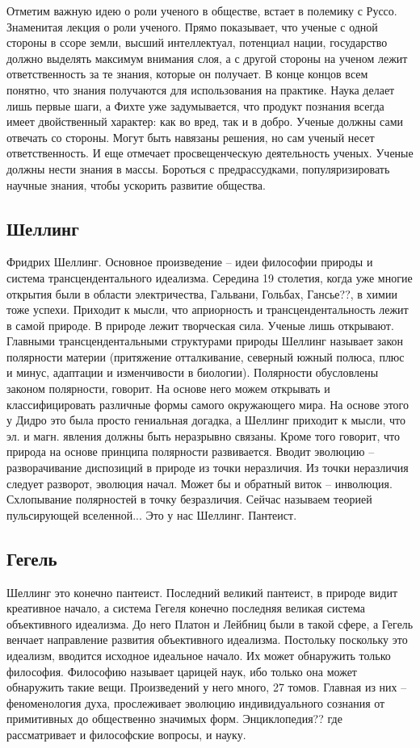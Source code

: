 \documentclass[a4paper, 12pt]{article}
\begin{document}
Отметим важную идею о роли ученого в обществе, встает в полемику 
с Руссо. Знаменитая лекция о роли ученого. Прямо показывает, что ученые 
с одной стороны в ссоре земли, высший интеллектуал, потенциал нации, 
государство должно выделять максимум внимания слоя, а с другой стороны 
на ученом лежит ответственность за те знания, которые он получает. 
В конце концов всем понятно, что знания получаются для использования на 
практике. Наука делает лишь первые шаги, а Фихте уже задумывается, что 
продукт познания всегда имеет двойственный характер: как во вред, так 
и в добро. Ученые должны сами отвечать со стороны. Могут быть навязаны 
решения, но сам ученый несет ответственность. И еще отмечает 
просвещенческую деятельность ученых. Ученые должны нести знания в массы. 
Бороться с предрассудками, популяризировать научные знания, чтобы 
ускорить развитие общества.

\subsection{Шеллинг}
Фридрих Шеллинг. Основное произведение -- идеи философии природы 
и система трансцендентального идеализма. Середина 19 столетия, когда уже 
многие открытия были в области электричества, Гальвани, Гольбах, 
Гансье??, в химии тоже успехи. Приходит к мысли, что априорность 
и трансцендентальность лежит в самой природе. В природе лежит творческая 
сила. Ученые лишь открывают. Главными трансцендентальными структурами 
природы Шеллинг называет закон полярности материи (притяжение 
отталкивание, северный южный полюса, плюс и минус, адаптации 
и изменчивости в биологии). Полярности обусловлены законом полярности, 
говорит. На основе него можем открывать и классифицировать различные 
формы самого окружающего мира. На основе этого у Дидро это была просто 
гениальная догадка, а Шеллинг приходит к мысли, что эл. и магн. явления 
должны быть неразрывно связаны. Кроме того говорит, что природа на 
основе принципа полярности развивается. Вводит эволюцию -- 
разворачивание диспозиций в природе из точки неразличия. Из точки 
неразличия следует разворот, эволюция начал. Может бы и обратный виток 
-- инволюция. Схлопывание полярностей в точку безразличия. Сейчас 
называем теорией пульсирующей вселенной... Это у нас Шеллинг. Пантеист.

\subsection{Гегель}
Шеллинг это конечно пантеист. Последний великий пантеист, в природе 
видит креативное начало, а система Гегеля конечно последняя великая 
система объективного идеализма. До него Платон и Лейбниц были в такой 
сфере, а Гегель венчает направление развития объективного идеализма. 
Постольку поскольку это идеализм, вводится исходное идеальное начало. Их 
может обнаружить только философия. Философию называет царицей наук, ибо 
только она может обнаружить такие вещи. Произведений у него много, 27 
томов. Главная из них -- феноменология духа, прослеживает эволюцию 
индивидуального сознания от примитивных до общественно значимых форм. 
Энциклопедия?? где рассматривает и философские вопросы, и науку.
\end{document}
